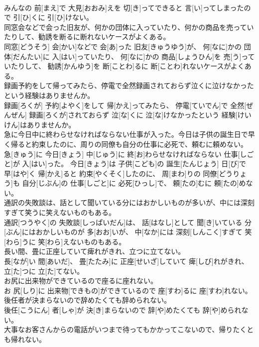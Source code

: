 \documentclass[8pt]{extreport}
\begin{document}
\begin{CJK}{UTF8}{min}
\\	みんなの 前[まえ]で 大見[おおみ]えを 切[き]ってできると 言[い]ってしまったので 引[ひ]くに 引[ひ]けない。
\\	同窓会などで会った旧友が、何かの団体に入っていたり、何かの商品を売っていたりして、勧誘を断るに断れないケースがよくある。	
\\	同窓[どうそう] 会[かい]などで 会[あ]った 旧友[きゅうゆう]が、 何[なに]かの 団体[だんたい]に 入[はい]っていたり、 何[なに]かの 商品[しょうひん]を 売[う]っていたりして、 勧誘[かんゆう]を 断[ことわ]るに 断[ことわ]れないケースがよくある。
\\	録画予約をして帰ってみたら、停電で全然録画されておらず泣くに泣けなかったという経験はありませんか。	
\\	録画[ろくが] 予約[よやく]をして 帰[かえ]ってみたら、 停電[ていでん]で 全然[ぜんぜん] 録画[ろくが]されておらず 泣[な]くに 泣[な]けなかったという 経験[けいけん]はありませんか。
\\	急に今日中に終わらせなければならない仕事が入った。今日は子供の誕生日で早く帰ると約束したのに、周りの同僚も自分の仕事に必死で、頼むに頼めない。	
\\	急[きゅう]に 今日[きょう] 中[じゅう]に 終[お]わらせなければならない 仕事[しごと]が 入[はい]った。 今日[きょう]は 子供[こども]の 誕生[たんじょう] 日[び]で 早[はや]く 帰[かえ]ると 約束[やくそく]したのに、 周[まわ]りの 同僚[どうりょう]も 自分[じぶん]の 仕事[しごと]に 必死[ひっし]で、 頼[たの]むに 頼[たの]めない。
\\	通訳の失敗談は、話として聞いている分にはおかしいものが多いが、中には深刻すぎて笑うに笑えないものもある。	
\\	通訳[つうやく]の 失敗談[しっぱいだん]は、 話[はなし]として 聞[き]いている 分[ぶん]にはおかしいものが 多[おお]いが、 中[なか]には 深刻[しんこく]すぎて 笑[わら]うに 笑[わら]えないものもある。
\\	長い間、畳に正座していて痺れがきれ、立つに立てない。	
\\	長[なが]い 間[あいだ]、 畳[たたみ]に 正座[せいざ]していて 痺[しび]れがきれ、 立[た]つに 立[た]てない。
\\	お尻に出来物ができているので座るに座れない。	
\\	お 尻[しり]に 出来物[できもの]ができているので 座[すわ]るに 座[すわ]れない。
\\	後任者が決まらないので辞めたくても辞められない。	
\\	後任[こうにん] 者[しゃ]が 決[き]まらないので 辞[や]めたくても 辞[や]められない。
\\	大事なお客さんからの電話がいつまで待ってもかかってこないので、帰りたくとも帰れない。	

\end{CJK}
\end{document}
